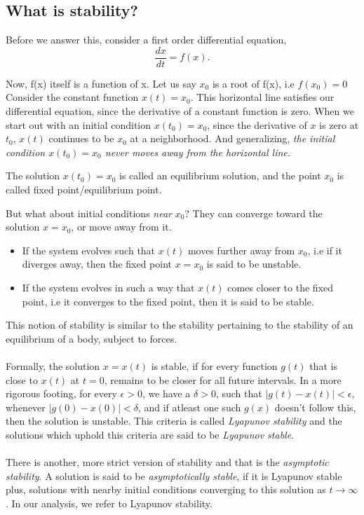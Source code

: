 \documentclass{article}
\begin{document}
\subsection{What is stability?}
Before we answer this, consider a first order differential equation, $$\frac{dx}{dt} = f(x).$$

Now, f(x) itself is a function of x. Let us say $x_0$ is a root of f(x), i.e $f(x_0) = 0$ Consider the constant function $x(t) = x_0$. This horizontal line satisfies our differential equation, since the derivative of a constant function is zero. When we start out with an initial condition $x(t_0) = x_0$, since the derivative of $x$ is zero at $t_0$, $x(t)$ continues to be $x_0$ at a neighborhood. And generalizing, \emph{the initial condition $x(t_0) = x_0$ never moves away from the horizontal line.}

The solution $x(t_0) = x_0$ is called an equilibrium solution, and the point $x_0$ is called fixed point/equilibrium point.

But what about initial conditions \emph{near} $x_0$? They can converge toward the solution $x = x_0$, or move away from it. 

\begin{itemize}
    \item If the system evolves such that $x(t)$ moves further away from $x_0$, i.e if it diverges away, then the fixed point $x = x_0$ is said to be unstable.
    \item If the system evolves in such a way that $x(t)$ comes closer to the fixed point, i.e it converges to the fixed point, then it is said to be stable.
\end{itemize}

This notion of stability is similar to the stability pertaining to the stability of an equilibrium of a body, subject to forces.
\\
\\
Formally, the solution $x = x(t)$ is stable, if for every function $g(t)$ that is close to $x(t)$ at $t = 0$, remains to be closer for all future intervals. In a more rigorous footing, for every $\epsilon > 0$, we have a $\delta > 0$, such that $|g(t) - x(t)| < \epsilon$, whenever $|g(0) - x(0)| < \delta$, and if atleast one such $g(x)$ doesn't follow this, then the solution is unstable. This criteria is called \emph{Lyapunov stability} and the solutions which uphold this criteria are said to be \emph{Lyapunov stable}.
\\
\\
There is another, more strict version of stability and that is the \emph{asymptotic stability}. A solution is said to be \emph{asymptotically stable}, if it is Lyapunov stable plus, solutions with nearby initial conditions converging to this solution as $t \to \infty$. In our analysis, we refer to Lyapunov stability.
\end{document}
